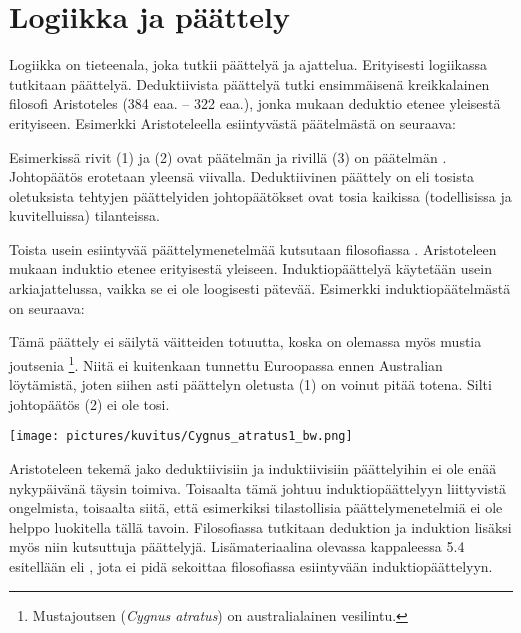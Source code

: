 \chapter{Logiikka ja päättely}

Logiikka on tieteenala, joka tutkii päättelyä ja ajattelua.
Erityisesti logiikassa tutkitaan  päättelyä.
Deduktiivista päättelyä tutki ensimmäisenä kreikkalainen filosofi Aristoteles (384 eaa. -- 322 eaa.),
jonka mukaan deduktio etenee yleisestä erityiseen.
Esimerkki Aristoteleella esiintyvästä pää\-tel\-mäs\-tä on seuraava:

\bigskip
\begin{center}
\end{center}
\bigskip

Esimerkissä rivit (1) ja (2) ovat päätelmän  ja
rivillä (3) on päätelmän .
Johtopäätös erotetaan yleensä viivalla.
Deduktiivinen päättely on  eli
tosista oletuksista tehtyjen päättelyiden johtopäätökset ovat tosia kaikissa
(todellisissa ja kuvitelluissa) tilanteissa.

Toista usein esiintyvää päättelymenetelmää kutsutaan filosofiassa
.
Aristoteleen mukaan induktio etenee erityisestä yleiseen.
Induktiopäättelyä käytetään usein arkiajattelussa, vaikka se ei
ole loogisesti pätevää.
Esimerkki induktiopäätelmästä on seuraava:

\bigskip
\begin{center}
\end{center}
\bigskip

Tämä päättely ei säilytä väitteiden totuutta, koska on olemassa myös mustia joutsenia
\footnote{Mustajoutsen ({\it Cygnus atratus}) on australialainen vesilintu.}.
Niitä ei kuitenkaan tunnettu Euroopassa ennen Australian löytämistä, joten
siihen asti päättelyn oletusta (1) on voinut pitää totena.
Silti johtopäätös (2) ei ole tosi.

\bigskip
\begin{center}
    \texttt{[image: pictures/kuvitus/Cygnus\_atratus1\_bw.png]}
\end{center}
\bigskip

Aristoteleen tekemä jako deduktiivisiin ja induktiivisiin päättelyihin
ei ole enää nykypäivänä täysin toimiva.
Toisaalta tämä johtuu induktiopäättelyyn liittyvistä ongelmista,
toisaalta siitä, että esimerkiksi tilastollisia päättelymenetelmiä
ei ole helppo luokitella tällä tavoin.
Filosofiassa tutkitaan deduktion ja induktion lisäksi myös niin kutsuttuja
 päättelyjä.
Lisämateriaalina olevassa kappaleessa 5.4 esitellään
 eli
,
jota ei pidä sekoittaa filosofiassa esiintyvään induktiopäättelyyn.

